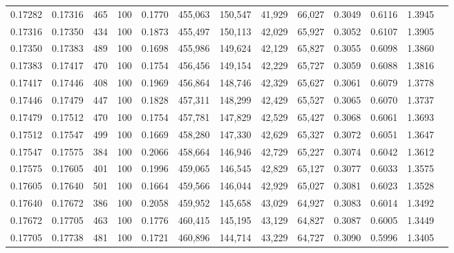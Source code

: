 \begin{tabular}{rrrrrrrrrrrrr}
0.17282 & 0.17316 &   465 & 100 &                                     0.1770 & 455,063 & 150,547 &  41,929 &  66,027 & 0.3049 & 0.6116 & 1.3945 \\
0.17316 & 0.17350 &   434 & 100 &                                     0.1873 & 455,497 & 150,113 &  42,029 &  65,927 & 0.3052 & 0.6107 & 1.3905 \\
0.17350 & 0.17383 &   489 & 100 &                                     0.1698 & 455,986 & 149,624 &  42,129 &  65,827 & 0.3055 & 0.6098 & 1.3860 \\
0.17383 & 0.17417 &   470 & 100 &                                     0.1754 & 456,456 & 149,154 &  42,229 &  65,727 & 0.3059 & 0.6088 & 1.3816 \\
0.17417 & 0.17446 &   408 & 100 &                                     0.1969 & 456,864 & 148,746 &  42,329 &  65,627 & 0.3061 & 0.6079 & 1.3778 \\
0.17446 & 0.17479 &   447 & 100 &                                     0.1828 & 457,311 & 148,299 &  42,429 &  65,527 & 0.3065 & 0.6070 & 1.3737 \\
0.17479 & 0.17512 &   470 & 100 &                                     0.1754 & 457,781 & 147,829 &  42,529 &  65,427 & 0.3068 & 0.6061 & 1.3693 \\
0.17512 & 0.17547 &   499 & 100 &                                     0.1669 & 458,280 & 147,330 &  42,629 &  65,327 & 0.3072 & 0.6051 & 1.3647 \\
0.17547 & 0.17575 &   384 & 100 &                                     0.2066 & 458,664 & 146,946 &  42,729 &  65,227 & 0.3074 & 0.6042 & 1.3612 \\
0.17575 & 0.17605 &   401 & 100 &                                     0.1996 & 459,065 & 146,545 &  42,829 &  65,127 & 0.3077 & 0.6033 & 1.3575 \\
0.17605 & 0.17640 &   501 & 100 &                                     0.1664 & 459,566 & 146,044 &  42,929 &  65,027 & 0.3081 & 0.6023 & 1.3528 \\
0.17640 & 0.17672 &   386 & 100 &                                     0.2058 & 459,952 & 145,658 &  43,029 &  64,927 & 0.3083 & 0.6014 & 1.3492 \\
0.17672 & 0.17705 &   463 & 100 &                                     0.1776 & 460,415 & 145,195 &  43,129 &  64,827 & 0.3087 & 0.6005 & 1.3449 \\
0.17705 & 0.17738 &   481 & 100 &                                     0.1721 & 460,896 & 144,714 &  43,229 &  64,727 & 0.3090 & 0.5996 & 1.3405 \\

\end{tabular}
